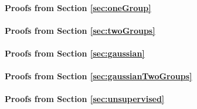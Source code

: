\paragraph*{Proofs from Section \ref{sec:oneGroup}}

\paragraph*{Proofs from Section \ref{sec:twoGroups}}

\paragraph*{Proofs from Section \ref{sec:gaussian}}

\paragraph*{Proofs from Section \ref{sec:gaussianTwoGroups}}

\paragraph*{Proofs from Section \ref{sec:unsupervised}}
